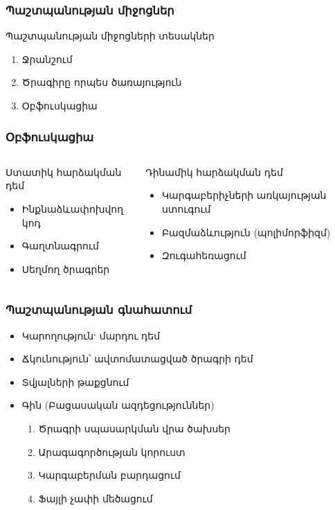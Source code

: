 \documentclass[11pt]{beamer}
\begin{document}
\begin{frame}\frametitle{Պաշտպանության միջոցներ}
Պաշտպանության միջոցների տեսակներ
\begin{enumerate}
\item Ջրանշում
\item Ծրագիրը որպես ծառայություն
\item Օբֆուսկացիա
\end{enumerate}
\end{frame}

\begin{frame}\frametitle{Օբֆուսկացիա}
\footnotesize{
\begin{columns}[t]
\begin{block}{\small{Ստատիկ հարձակման դեմ}}
\begin{itemize}
\item Ինքնաձևափոխվող կոդ
\item Գաղտնագրում
\item Սեղմող ծրագրեր
\end{itemize}
\end{block}
\begin{block}{\small{Դինամիկ հարձակման դեմ}}
\begin{itemize}
\item Կարգաբերիչների առկայության ստուգում
\item Բազմաձևություն (պոլիմորֆիզմ)
\item Զուգահեռացում
\end{itemize}
\end{block}
\end{columns}
}
\end{frame}

\begin{frame}\frametitle{Պաշտպանության գնահատում}
\begin{itemize}
\item Կարողություն` մարդու դեմ
\item Ճկունություն՝ ավտոմատացված ծրագրի դեմ
\item Տվյալների թաքցնում
\item Գին (Բացասական ազդեցություններ)
	\begin{enumerate}
	\item Ծրագրի սպասարկման վրա ծախսեր
	\item Արագագործության կորուստ
	\item Կարգաբերման բարդացում
	\item Ֆայլի չափի մեծացում
	\end{enumerate}
\end{itemize}
\end{frame}
\end{document}
